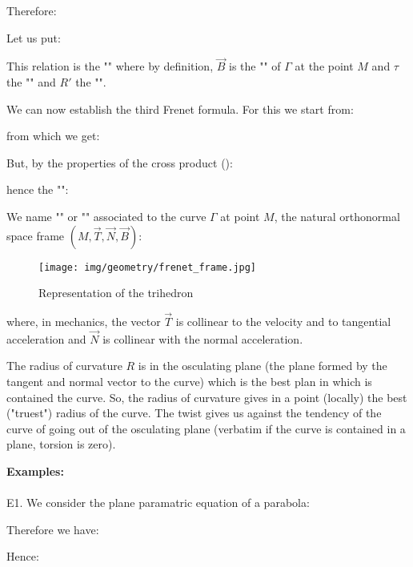 {	Therefore:
	
	
	Let us put:
	
	This relation is the "" where by definition, $\vec{B}$ is the "" of $\Gamma$ at the point $M$ and $\tau$ the "" and $R'$ the "".
	
	We can now establish the third Frenet formula. For this we start from:
	
	from which we get:
	
	But, by the properties of the cross product ():
	
	hence the "":
	
	We name "" or "" associated to the curve $\Gamma$ at point $M$, the natural orthonormal space frame $(M,\vec{T},\vec{N},\vec{B})$:
	\begin{figure}[H]
		\centering
		\texttt{[image: img/geometry/frenet\_frame.jpg]}
		\caption{Representation of the trihedron}
	\end{figure}
	where, in mechanics, the vector $\vec{T}$ is collinear to the velocity and to tangential acceleration and $\vec{N}$ is collinear with the normal acceleration.
	\begin{tcolorbox}[title=Remark,colframe=black,arc=10pt]
	The radius of curvature $R$ is in the osculating plane (the plane formed by the tangent and normal vector  to the curve) which is the best plan in which is contained the curve. So, the radius of curvature gives in a point (locally) the best ("truest") radius of the curve. The twist gives us against the tendency of the curve of going out of the osculating plane (verbatim if the curve is contained in a plane, torsion is zero).
	\end{tcolorbox}
	\begin{tcolorbox}[colframe=black,colback=white,sharp corners]
	\textbf{{\Large {}}Examples:}\\\\
	E1. We consider the plane paramatric equation of a parabola:
	
	Therefore we have:
	
	Hence:
	
	\end{tcolorbox}
	
}

